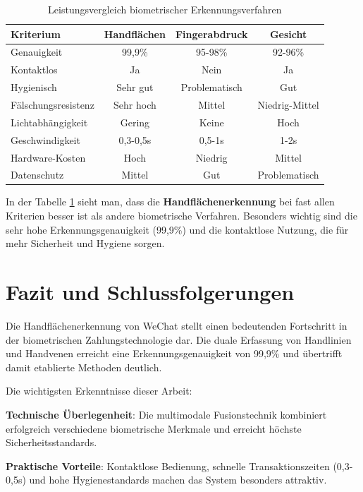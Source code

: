 \documentclass[paper=a4,fontsize=12pt,ngerman]{scrartcl}
\begin{document}
\begin{table}[!htb]
\centering
\begin{tabular}{|l|c|c|c|}
\hline
\textbf{Kriterium} & \textbf{Handflächen} & \textbf{Fingerabdruck} & \textbf{Gesicht} \\
\hline
Genauigkeit & 99,9\% & 95-98\% & 92-96\% \\
\hline
Kontaktlos & Ja & Nein & Ja \\
\hline
Hygienisch & Sehr gut & Problematisch & Gut \\
\hline
Fälschungsresistenz & Sehr hoch & Mittel & Niedrig-Mittel \\
\hline
Lichtabhängigkeit & Gering & Keine & Hoch \\
\hline
Geschwindigkeit & 0,3-0,5s & 0,5-1s & 1-2s \\
\hline
Hardware-Kosten & Hoch & Niedrig & Mittel \\
\hline
Datenschutz & Mittel & Gut & Problematisch \\
\hline
\end{tabular}
\caption{Leistungsvergleich biometrischer Erkennungsverfahren}
\label{tab:biometric-comparison}
\end{table}

In der Tabelle \ref{tab:biometric-comparison} sieht man, dass die \textbf{Handflächenerkennung} bei fast allen Kriterien besser ist als andere biometrische Verfahren. Besonders wichtig sind die sehr hohe Erkennungsgenauigkeit (99,9\%) und die kontaktlose Nutzung, die für mehr Sicherheit und Hygiene sorgen.


\vspace{2cm}

\section{Fazit und Schlussfolgerungen}
Die Handflächenerkennung von WeChat stellt einen bedeutenden Fortschritt in der biometrischen Zahlungstechnologie dar. Die duale Erfassung von Handlinien und Handvenen erreicht eine Erkennungsgenauigkeit von 99,9\% und übertrifft damit etablierte Methoden deutlich.

Die wichtigsten Erkenntnisse dieser Arbeit:

\textbf{Technische Überlegenheit}: Die multimodale Fusionstechnik kombiniert erfolgreich verschiedene biometrische Merkmale und erreicht höchste Sicherheitsstandards.

\textbf{Praktische Vorteile}: Kontaktlose Bedienung, schnelle Transaktionszeiten (0,3-0,5s) und hohe Hygienestandards machen das System besonders attraktiv.
\end{document}
